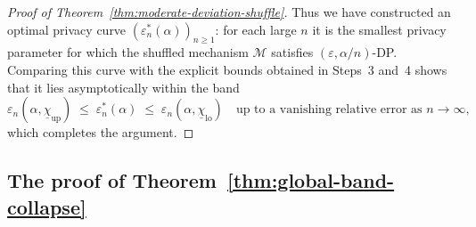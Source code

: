 \documentclass{article}
\theoremstyle{plain}
\theoremstyle{definition}
\begin{document}
\begin{proof}[Proof of Theorem~\ref{thm:moderate-deviation-shuffle}]
Thus we have constructed an optimal privacy curve
$(\varepsilon_n^{\ast}(\alpha))_{n\ge1}$: for each large $n$ it
is the smallest privacy parameter for which the shuffled mechanism
$\mathcal M$ satisfies $(\varepsilon,\alpha/n)$-DP. Comparing this curve
with the explicit bounds obtained in Steps~3 and~4 shows that it lies
asymptotically within the band
\[
  \varepsilon_n(\alpha,\underline\chi_{\mathrm{up}})
  \;\le\;
  \varepsilon_n^{\ast}(\alpha)
  \;\le\;
  \varepsilon_n(\alpha,\underline\chi_{\mathrm{lo}})
  \quad\text{up to a vanishing relative error as }n\to\infty,
\]
which completes the argument.



\end{proof}



\subsection{The proof of Theorem~\ref{thm:global-band-collapse}}
\label{app:proof-shuffle-index-structure}

\globalbandcollapse*
\end{document}
